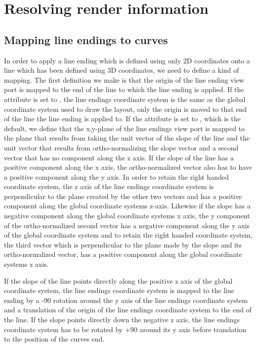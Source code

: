 
\section{Resolving render information}
\label{apdx-mappings}

\subsection{Mapping line endings to curves}
\label{mapping}

In order to apply a line ending which is defined using only 2D coordinates onto a line which
has been defined using 3D coordinates, we need to define a kind of mapping.
The first definition we make is that the origin of the line ending view port is
mapped to the end of the line to which the line ending is applied.
If the  attribute is set to , the
line endings coordinate system is the same as the global coordinate system used to draw the layout,
only the origin is moved to that end of the line the line ending is applied to. If
the  attribute is set to , which is
the default, we define that the x,y-plane of the line endings view port is mapped to the
plane that results from taking the unit vector of the slope of the line and the unit
vector that results from ortho-normalizing the slope vector and a second vector
that has no component along the z axis. If the slope of the line has a positive component along the x axis,
the ortho-normalized vector also has to have a positive component along the y axis. In order to retain the
right handed coordinate system, the z axis of the line endings coordinate system is perpendicular to the plane created by the other two vectors and has a positive component along the global coordinate systems z-axis.
Likewise if the slope has a negative component along the global coordinate systems x axis, the y component of the
ortho-normalized second vector has a negative component along the y axis of the global coordinate system and to 
retain the right handed coordinate system, the third vector which is perpendicular to the plane made by the slope
and its ortho-normalized vector, has a positive component along the global coordinate systems z axis. 

If the slope of the line points directly along the positive z axis of the global coordinate system, the 
line endings coordinate system is mapped to the line ending by a -90 rotation around the y axis of the 
line endings coordinate system and a translation of the origin of the line endings coordinate system to 
the end of the line. If the slope points directly down the negative z axis, the line endings coordinate 
system has to be rotated by +90 around its y axis before translation to the position of the curves end.   

